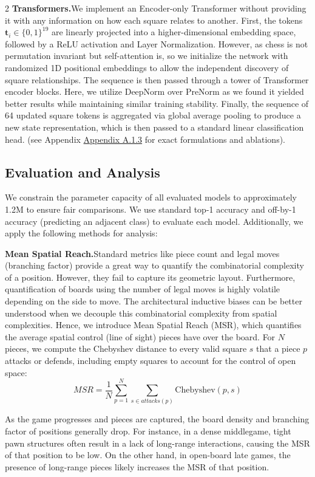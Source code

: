 \documentclass[a4paper,10pt]{article}
\begin{document}
\begin{multicols*}{2}
\textbf{Transformers.}\enskip We implement an Encoder-only Transformer without providing it with any information on how each square relates to another. First, the tokens $\mathbf{t}_i \in \{0, 1\}^{19}$ are linearly projected into a higher-dimensional embedding space, followed by a ReLU activation and Layer Normalization. However, as chess is not permutation invariant but self-attention is, so we initialize the network with randomized 1D positional embeddings to allow the independent discovery of square relationships. The sequence is then passed through a tower of Transformer encoder blocks. Here, we utilize DeepNorm \cite{wang2024deepnet} over PreNorm as we found it yielded better results while maintaining similar training stability. Finally, the sequence of 64 updated square tokens is aggregated via global average pooling to produce a new state representation, which is then passed to a standard linear classification head. (see Appendix \hyperref[transformer_details]{Appendix A.1.3} for exact formulations and ablations).

\subsection{Evaluation and Analysis}
We constrain the parameter capacity of all evaluated models to approximately 1.2M to ensure fair comparisons. We use standard top-1 accuracy and off-by-1 accuracy (predicting an adjacent class) to evaluate each model. Additionally, we apply the following methods for analysis:

\textbf{Mean Spatial Reach.}\enskip Standard metrics like piece count and legal moves (branching factor) provide a great way to quantify the combinatorial complexity of a position. However, they fail to capture its geometric layout. Furthermore, quantification of boards using the number of legal moves is highly volatile depending on the side to move. The architectural inductive biases can be better understood when we decouple this combinatorial complexity from spatial complexities. Hence, we introduce Mean Spatial Reach (MSR), which quantifies the average spatial control (line of sight) pieces have over the board. For $N$ pieces, we compute the Chebyshev distance to every valid square $s$ that a piece $p$ attacks or defends, including empty squares to account for the control of open space:
\[MSR = \frac{1}{N} \sum_{p=1}^{N} \sum_{s \in attacks(p)} \text{Chebyshev}(p, s)\]

As the game progresses and pieces are captured, the board density and branching factor of positions generally drop. For instance, in a dense middlegame, tight pawn structures often result in a lack of long-range interactions, causing the MSR of that position to be low. On the other hand, in open-board late games, the presence of long-range pieces likely increases the MSR of that position. 


\end{multicols*}
\end{document}
